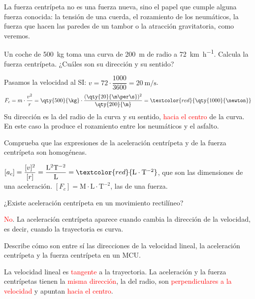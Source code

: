 La fuerza centrípeta no es una fuerza nueva, sino el papel que cumple alguna fuerza conocida: la tensión de una cuerda, el rozamiento de los neumáticos, la fuerza que hacen las paredes de un tambor o la atracción gravitatoria, como veremos.

\begin{example}
    Un coche de \qty{500}{\kg} toma una curva de \qty{200}{\m} de radio a \qty{72}{\km\per\hour}. Calcula la fuerza centrípeta. ¿Cuáles son su dirección y su sentido?

    Pasamos la velocidad al SI: \(v = 72 \cdot \dfrac{1000}{3600} = \qty{20}{\m\per\s}\).
    \[ F_c = m \cdot \frac{v^2}{r} = \qty{500}{\kg} \cdot \frac{(\qty{20}{\m\per\s})^2}{\qty{200}{\m}} = \textcolor{red}{\qty{1000}{\newton}} \]
    Su dirección es la del radio de la curva y su sentido, \textcolor{red}{hacia el centro} de la curva. En este caso la produce el rozamiento entre los neumáticos y el asfalto.
\end{example}

\begin{exercise}
    Comprueba que las expresiones de la aceleración centrípeta y de la fuerza centrípeta son homogéneas.
    \begin{solu}
        \([a_c] = \dfrac{[v]^2}{[r]} = \dfrac{\mathrm{L}^2\mathrm{T}^{-2}}{\mathrm{L}} = \textcolor{red}{\mathrm{L} \cdot \mathrm{T}^{-2}}\), que son las dimensiones de una aceleración. \([F_c] = \mathrm{M} \cdot \mathrm{L} \cdot \mathrm{T}^{-2}\), las de una fuerza.
    \end{solu}
\end{exercise}

\begin{exercise}
    ¿Existe aceleración centrípeta en un movimiento rectilíneo?
    \begin{solu}
        \textcolor{red}{No}. La aceleración centrípeta aparece cuando cambia la dirección de la velocidad, es decir, cuando la trayectoria es curva.
    \end{solu}
\end{exercise}

\begin{exercise}
    Describe cómo son entre sí las direcciones de la velocidad lineal, la aceleración centrípeta y la fuerza centrípeta en un MCU.
    \begin{solu}
        La velocidad lineal es \textcolor{red}{tangente} a la trayectoria. La aceleración y la fuerza centrípetas tienen la \textcolor{red}{misma dirección}, la del radio, son \textcolor{red}{perpendiculares a la velocidad} y apuntan \textcolor{red}{hacia el centro}.
    \end{solu}
\end{exercise}


